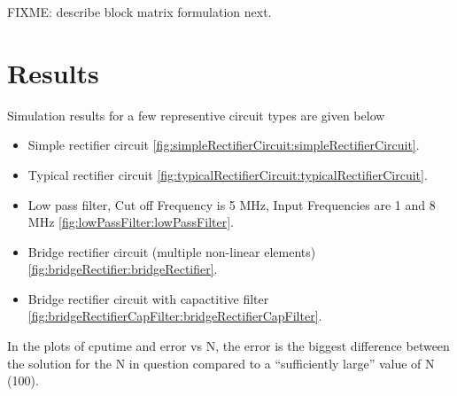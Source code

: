\documentclass[12pt,journal,compsoc]{../ieeepaper/IEEEtran}
\begin{document}
FIXME: describe block matrix formulation next.

\section{Results}

Simulation results for a few representive circuit types are given below

\begin{itemize}
\item Simple rectifier circuit \cref{fig:simpleRectifierCircuit:simpleRectifierCircuit}.
\item Typical rectifier circuit \cref{fig:typicalRectifierCircuit:typicalRectifierCircuit}.
\item Low pass filter, Cut off Frequency is 5 MHz, Input Frequencies are 1 and 8 MHz \cref{fig:lowPassFilter:lowPassFilter}.
\item Bridge rectifier circuit (multiple non-linear elements) \cref{fig:bridgeRectifier:bridgeRectifier}.
\item Bridge rectifier circuit with capactitive filter \cref{fig:bridgeRectifierCapFilter:bridgeRectifierCapFilter}.
\end{itemize}

In the plots of cputime and error vs N, the error is the biggest difference between the solution for the N in question compared to a ``sufficiently large'' value of N (100).

\begin{figure*}[!t]
\centering
{}
\hfil
{}
\caption{Simple rectifier circuit and simulation results.}
\label{fig:simpleRectifierCircuit:simpleRectifierCircuit}
\end{figure*}
\end{document}

